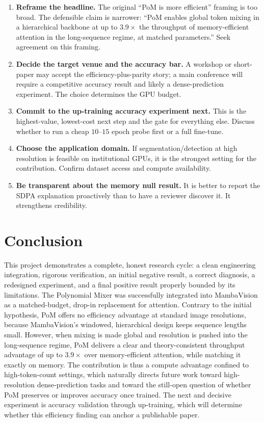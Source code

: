 \documentclass[11pt,a4paper]{article}
\begin{document}
\begin{enumerate}[leftmargin=1.6em]
    \item \textbf{Reframe the headline.} The original ``PoM is more efficient'' framing is too broad. The defensible claim is narrower: ``PoM enables global token mixing in a hierarchical backbone at up to $3.9\times$ the throughput of memory-efficient attention in the long-sequence regime, at matched parameters.'' Seek agreement on this framing.
    \item \textbf{Decide the target venue and the accuracy bar.} A workshop or short-paper may accept the efficiency-plus-parity story; a main conference will require a competitive accuracy result and likely a dense-prediction experiment. The choice determines the GPU budget.
    \item \textbf{Commit to the up-training accuracy experiment next.} This is the highest-value, lowest-cost next step and the gate for everything else. Discuss whether to run a cheap $10$--$15$ epoch probe first or a full fine-tune.
    \item \textbf{Choose the application domain.} If segmentation/detection at high resolution is feasible on institutional GPUs, it is the strongest setting for the contribution. Confirm dataset access and compute availability.
    \item \textbf{Be transparent about the memory null result.} It is better to report the SDPA explanation proactively than to have a reviewer discover it. It strengthens credibility.
\end{enumerate}

\section{Conclusion}

This project demonstrates a complete, honest research cycle: a clean engineering integration, rigorous verification, an initial negative result, a correct diagnosis, a redesigned experiment, and a final positive result properly bounded by its limitations. The Polynomial Mixer was successfully integrated into MambaVision as a matched-budget, drop-in replacement for attention. Contrary to the initial hypothesis, PoM offers no efficiency advantage at standard image resolutions, because MambaVision's windowed, hierarchical design keeps sequence lengths small. However, when mixing is made global and resolution is pushed into the long-sequence regime, PoM delivers a clear and theory-consistent throughput advantage of up to $3.9\times$ over memory-efficient attention, while matching it exactly on memory. The contribution is thus a compute advantage confined to high-token-count settings, which naturally directs future work toward high-resolution dense-prediction tasks and toward the still-open question of whether PoM preserves or improves accuracy once trained. The next and decisive experiment is accuracy validation through up-training, which will determine whether this efficiency finding can anchor a publishable paper.
\end{document}
